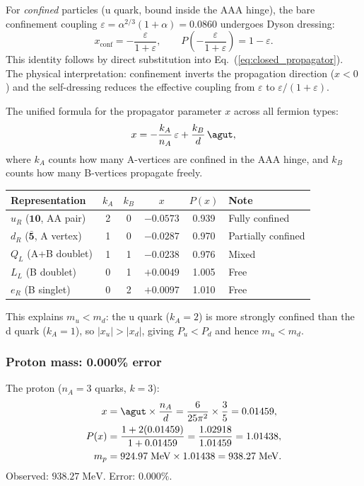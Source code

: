 For \emph{confined} particles (u quark, bound inside the AAA hinge), the bare confinement coupling $\varepsilon = \alpha^{2/3}(1+\alpha) = 0.0860$ undergoes Dyson dressing:
\begin{equation}
\label{eq:dyson_dressing}
x_\mathrm{conf} = -\frac{\varepsilon}{1+\varepsilon}, \qquad P\!\left(-\frac{\varepsilon}{1+\varepsilon}\right) = 1 - \varepsilon.
\end{equation}
This identity follows by direct substitution into Eq.~(\ref{eq:closed_propagator}).  The physical interpretation: confinement inverts the propagation direction ($x < 0$) and the self-dressing reduces the effective coupling from $\varepsilon$ to $\varepsilon/(1+\varepsilon)$.

The unified formula for the propagator parameter $x$ across all fermion types:
\begin{equation}
x = -\frac{k_A}{n_A}\,\varepsilon + \frac{k_B}{d}\,\agut,
\end{equation}
where $k_A$ counts how many A-vertices are confined in the AAA hinge, and $k_B$ counts how many B-vertices propagate freely.

\begin{center}
\begin{tabular}{lccccl}
\hline
Representation & $k_A$ & $k_B$ & $x$ & $P(x)$ & Note \\
\hline
$u_R$ ($\mathbf{10}$, AA pair) & 2 & 0 & $-0.0573$ & 0.939 & Fully confined \\
$d_R$ ($\bar{\mathbf{5}}$, A vertex) & 1 & 0 & $-0.0287$ & 0.970 & Partially confined \\
$Q_L$ (A+B doublet) & 1 & 1 & $-0.0238$ & 0.976 & Mixed \\
$L_L$ (B doublet) & 0 & 1 & $+0.0049$ & 1.005 & Free \\
$e_R$ (B singlet) & 0 & 2 & $+0.0097$ & 1.010 & Free \\
\hline
\end{tabular}
\end{center}

This explains $m_u < m_d$: the u quark ($k_A = 2$) is more strongly confined than the d quark ($k_A = 1$), so $|x_u| > |x_d|$, giving $P_u < P_d$ and hence $m_u < m_d$.

\subsubsection{Proton mass: 0.000\% error}

The proton ($n_A = 3$ quarks, $k = 3$):
\begin{align}
x &= \agut \times \frac{n_A}{d} = \frac{6}{25\pi^2} \times \frac{3}{5} = 0.01459, \\
P(x) &= \frac{1 + 2(0.01459)}{1 + 0.01459} = \frac{1.02918}{1.01459} = 1.01438, \\
m_p &= 924.97\;\text{MeV} \times 1.01438 = 938.27\;\text{MeV}.
\end{align}
Observed: $938.27\;\text{MeV}$.  Error: $\mathbf{0.000\%}$.


